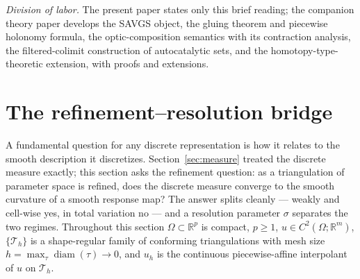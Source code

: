 \documentclass[11pt,a4paper]{article}
\theoremstyle{plain}
\theoremstyle{definition}
\theoremstyle{remark}
\newcommand{\RR}{\mathbb{R}}
\begin{document}
\emph{Division of labor.} The present paper states only this brief
reading; the companion theory paper develops the SAVGS object, the
gluing theorem and piecewise holonomy formula, the
optic-composition semantics with its contraction analysis, the
filtered-colimit construction of autocatalytic sets, and the
homotopy-type-theoretic extension, with proofs and extensions.

\section{The refinement--resolution bridge}
\label{sec:theoremB}

A fundamental question for any discrete representation is how it
relates to the smooth description it discretizes. Section~\ref{sec:measure}
treated the discrete measure exactly; this section asks the
refinement question: as a triangulation of parameter space is refined,
does the discrete measure converge to the smooth curvature of a smooth
response map? The answer splits cleanly --- weakly and cell-wise yes,
in total variation no --- and a resolution parameter $\sigma$ separates
the two regimes. Throughout this section $\Omega \subset \RR^p$ is compact, $p \ge 1$,
$u \in C^2(\Omega; \RR^m)$, $\{\mathcal{T}_h\}$ is a shape-regular family
of conforming triangulations with mesh size
$h = \max_\tau \operatorname{diam}(\tau) \to 0$, and $u_h$ is the
continuous piecewise-affine interpolant of $u$ on $\mathcal{T}_h$.
\end{document}
